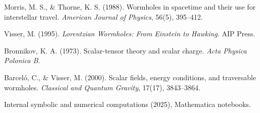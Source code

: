 \documentclass[12pt]{article}
\begin{document}
\begin{thebibliography}{9}
Morris, M. S., \& Thorne, K. S. (1988). Wormholes in spacetime and their use for interstellar travel. \textit{American Journal of Physics}, 56(5), 395–412.

Visser, M. (1995). \textit{Lorentzian Wormholes: From Einstein to Hawking}. AIP Press.

Bronnikov, K. A. (1973). Scalar-tensor theory and scalar charge. \textit{Acta Physica Polonica B}.

Barceló, C., \& Visser, M. (2000). Scalar fields, energy conditions, and traversable wormholes. \textit{Classical and Quantum Gravity}, 17(17), 3843–3864.

Internal symbolic and numerical computations (2025), Mathematica notebooks.
\end{thebibliography}
\end{document}

